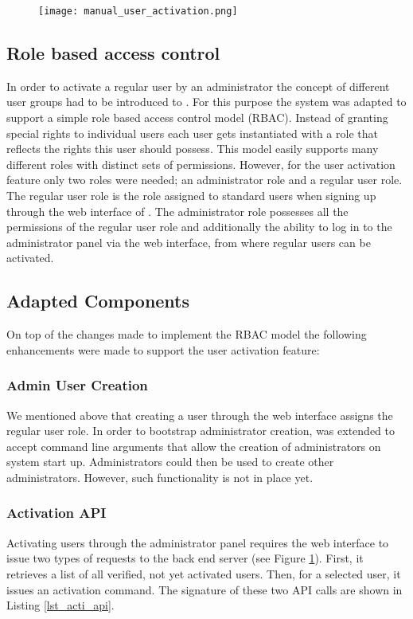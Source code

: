 \begin{figure}
	\centering
	\texttt{[image: manual\_user\_activation.png]}
	\label{acti:dia}
\end{figure}

\subsection{Role based access control}
In order to activate a regular user by an administrator the concept of different user groups had to be introduced to \lcs. For this purpose the system was adapted to support a simple role based access control model (RBAC). Instead of granting special rights to individual users each user gets instantiated with a role that reflects the rights this user should possess. This model easily supports many different roles with distinct sets of permissions. However, for the user activation feature only two roles were needed; an administrator role and a regular user role. The regular user role is the role assigned to standard users when signing up through the web interface of \lcs. The administrator role possesses all the permissions of the regular user role and additionally the ability to log in to the administrator panel via the web interface, from where regular users can be activated.

\subsection{Adapted Components}

On top of the changes made to implement the RBAC model the following enhancements were made to support the user activation feature:

\subsubsection{Admin User Creation}
We mentioned above that creating a user through the web interface assigns the regular user role. In order to bootstrap administrator creation, \lcs was extended to accept command line arguments that allow the creation of administrators on system start up. Administrators could then be used to create other administrators. However, such functionality is not in place yet.

\subsubsection{Activation API}
Activating users through the administrator panel requires the web interface to issue two types of requests to the back end server (see Figure \ref{acti:dia}). First, it retrieves a list of all verified, not yet activated users. Then, for a selected user, it issues an activation command. The signature of these two API calls are shown in Listing \ref{lst_acti_api}.

